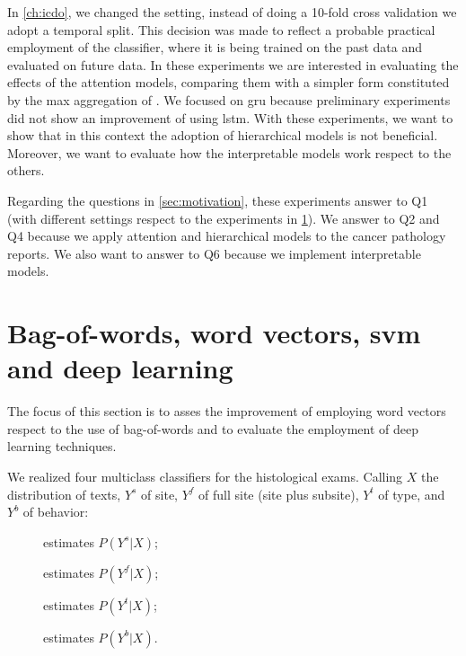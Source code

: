 In \cref{ch:icdo}, we changed the setting, instead of doing a 10-fold
cross validation we adopt a temporal split. This decision was made to
reflect a probable practical employment of the classifier, where it is
being trained on the past data and evaluated on future data. In these
experiments we are interested in evaluating the effects of the
attention models, comparing them with a simpler form constituted by
the max aggregation of \maxp{}. We focused on \ac{gru} because
preliminary experiments did not show an improvement of using
\ac{lstm}. With these experiments, we want to show that in this context
the adoption of hierarchical models is not beneficial. Moreover, we
want to evaluate how the interpretable models work respect to the
others.

Regarding the questions in \cref{sec:motivation}, these experiments
answer to Q1 (with different settings respect to the experiments in
\cref{ch:icdoFirst}). We answer to Q2 and Q4 because we apply attention and
hierarchical models to the cancer pathology reports. We also want to
answer to Q6 because we implement interpretable models. 


\section{Bag-of-words, word vectors, \ac{svm} and deep learning}
\label{ch:icdoFirst}
The focus of this section is to asses the improvement of employing
word vectors respect to the use of bag-of-words and to evaluate the
employment of deep learning techniques.

We realized four multiclass classifiers for the
histological exams. Calling $X$ the distribution of texts, $Y^s$
of site, $Y^f$ of full site (site plus subsite), $Y^t$ of type, and
$Y^b$ of behavior:
\begin{description}
  \item[\site{}] estimates $P(Y^s|X)$;
  \item[\fullSite{}] estimates $P(Y^f|X)$;
  \item[\type{}] estimates $P(Y^t|X)$;
  \item[\behaviour{}] estimates $P(Y^b|X)$.
\end{description}


